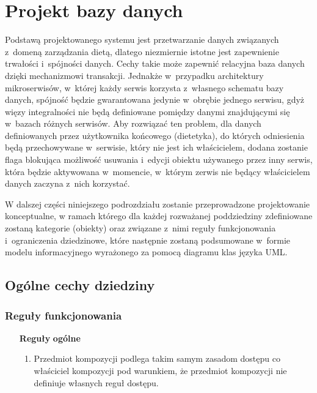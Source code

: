 
\section{Projekt bazy danych}\label{sec:database}

Podstawą projektowanego systemu jest przetwarzanie danych związanych z~domeną zarządzania dietą, dlatego niezmiernie istotne jest zapewnienie trwałości i~spójności danych.
Cechy takie może zapewnić relacyjna baza danych dzięki mechanizmowi transakcji\cite{book:bazury}.
Jednakże w~przypadku architektury mikroserwisów, w~której każdy serwis korzysta z~własnego schematu bazy danych, spójność będzie gwarantowana jedynie w~obrębie jednego serwisu,
gdyż więzy integralności nie będą definiowane pomiędzy danymi znajdującymi się w~bazach różnych serwisów.
Aby rozwiązać ten problem, dla danych definiowanych przez użytkownika końcowego (dietetyka), do których odniesienia będą przechowywane w~serwisie, który nie jest ich właścicielem,
dodana zostanie flaga blokująca możliwość usuwania i~edycji obiektu używanego przez inny serwis, która będzie aktywowana w~momencie, w~którym zerwis nie będący właścicielem danych zaczyna z~nich korzystać.

\par
W dalszej części niniejszego podrozdziału zostanie przeprowadzone projektowanie konceptualne,
w ramach którego dla każdej rozważanej poddziedziny zdefiniowane zostaną kategorie (obiekty) oraz związane z~nimi reguły funkcjonowania i~ograniczenia dziedzinowe\cite{book:bazury},
które następnie zostaną podsumowane w~formie modelu informacyjnego wyrażonego za pomocą diagramu klas języka UML.

\newpage %
\subsection{Ogólne cechy dziedziny}\label{ssubsubsec:database:domain}
\subsubsection{Reguły funkcjonowania}\label{subsubsec:database:domain:functionalRules}
\begin{itemize}[label={\textbf{Reguły dla}}, wide, labelwidth=!, labelindent=0pt]
    \setlength\itemsep{1.75em}
    \item[\textbf{Reguły}] \textbf{ogólne}
    \begin{enumerate}[label={\textbf{REG/0/\protect\twodigits{\arabic{enumi}}}}, wide, labelwidth=!, align=left, leftmargin=3cm]
        \item Przedmiot kompozycji podlega takim samym zasadom dostępu co właściciel kompozycji pod warunkiem, że przedmiot kompozycji nie definiuje własnych reguł dostępu.
    \end{enumerate}
\end{itemize}


